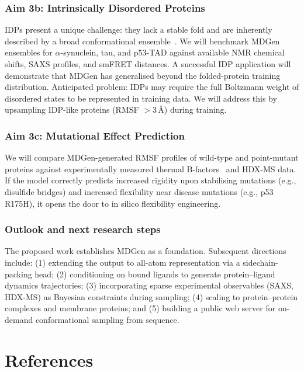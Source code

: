 \documentclass[12pt,letterpaper]{article}
\begin{document}
\subsubsection*{Aim 3b: Intrinsically Disordered Proteins}
IDPs present a unique challenge: they lack a stable fold and are inherently described by a broad conformational ensemble~\cite{uversky2013unusual,forman2012protein}. We will benchmark MDGen ensembles for $\alpha$-synuclein, tau, and p53-TAD against available NMR chemical shifts, SAXS profiles, and smFRET distances. A successful IDP application will demonstrate that MDGen has generalised beyond the folded-protein training distribution. Anticipated problem: IDPs may require the full Boltzmann weight of disordered states to be represented in training data. We will address this by upsampling IDP-like proteins (RMSF $>3$\,\AA) during training.

\subsubsection*{Aim 3c: Mutational Effect Prediction}
We will compare MDGen-generated RMSF profiles of wild-type and point-mutant proteins against experimentally measured thermal B-factors~\cite{berman2000pdb} and HDX-MS data. If the model correctly predicts increased rigidity upon stabilising mutations (e.g., disulfide bridges) and increased flexibility near disease mutations (e.g., p53 R175H), it opens the door to in silico flexibility engineering.

\subsubsection*{Outlook and next research steps}
The proposed work establishes MDGen as a foundation. Subsequent directions include: (1) extending the output to all-atom representation via a sidechain-packing head; (2) conditioning on bound ligands to generate protein--ligand dynamics trajectories; (3) incorporating sparse experimental observables (SAXS, HDX-MS) as Bayesian constraints during sampling; (4) scaling to protein--protein complexes and membrane proteins; and (5) building a public web server for on-demand conformational sampling from sequence.

\section*{References}
\vspace{-4pt}
\begingroup
\small

\end{document}
